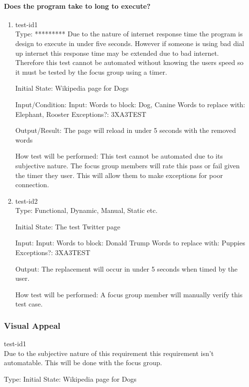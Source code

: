 \documentclass[12pt, titlepage]{article}
\begin{document}
\paragraph{Does the program take to long to execute?}
\begin{enumerate}
\item{test-id1\\}
Type: ********* Due to the nature of internet response time the program is design to execute in under five seconds. However if someone is using bad dial up internet this response time may be extended due to bad internet. Therefore this test cannot be automated without knowing the users speed so it must be tested by the focus group using a timer.
					
Initial State: Wikipedia page for Dogs
					
Input/Condition: Input: Words to block: Dog, Canine
Words to replace with: Elephant, Rooster
Exceptions?: 3XA3TEST
					
Output/Result: The page will reload in under 5 seconds with the removed words
					
How test will be performed: This test cannot be automated due to its subjective nature. The focus group members will rate this pass or fail given the timer they user. This will allow them to make exceptions for poor connection.
					
\item{test-id2\\}
Type: Functional, Dynamic, Manual, Static etc.
					
Initial State: The test Twitter page
					
Input:
Input:  Words to block: Donald Trump
Words to replace with: Puppies
Exceptions?: 3XA3TEST
					
Output: The replacement will occur in under 5 seconds when timed by the user.
					
How test will be performed: A focus group member will manually verify this test case.
\end{enumerate}
\subsubsection{Visual Appeal}
\item{test-id1\\}
Due to the subjective nature of this requirement this requirement isn't automatable. This will be done with the focus group.

Type:
Initial State: Wikipedia page for Dogs
					
\end{document}
